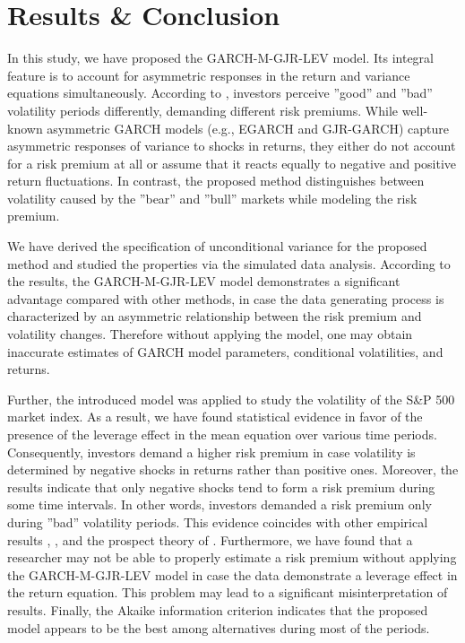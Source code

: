 \documentclass[authoryear, 1p]{elsarticle}
\numberwithin{equation}{section}
\begin{document}
\section{Results \& Conclusion}

In this study, we have proposed the GARCH-M-GJR-LEV model. Its integral feature is to account for asymmetric responses in the return and variance equations simultaneously. According to \citep{Bollerslev2022}, investors perceive ''good'' and ''bad'' volatility periods differently, demanding different risk premiums. While well-known asymmetric GARCH models (e.g., EGARCH and GJR-GARCH) capture asymmetric responses of variance to shocks in returns, they either do not account for a risk premium at all or assume that it reacts equally to negative and positive return fluctuations. In contrast, the proposed method distinguishes between volatility caused by the ''bear'' and ''bull'' markets while modeling the risk premium.

We have derived the specification of unconditional variance for the proposed method and studied the properties via the simulated data analysis. According to the results, the GARCH-M-GJR-LEV model demonstrates a significant advantage compared with other methods, in case the data generating process is characterized by an asymmetric relationship between the risk premium and volatility changes. Therefore without applying the model, one may obtain inaccurate estimates of GARCH model parameters, conditional volatilities, and returns.

Further, the introduced model was applied to study the volatility of the S\&P 500 market index. As a result, we have found statistical evidence in favor of the presence of the leverage effect in the mean equation over various time periods. Consequently, investors demand a higher risk premium in case volatility is determined by negative shocks in returns rather than positive ones. Moreover, the results indicate that only negative shocks tend to form a risk premium during some time intervals. In other words, investors demanded a risk premium only during ''bad'' volatility periods. This evidence coincides with other empirical results \citep{Bollerslev2006}, \citep{Rossi2015}, and the prospect theory of \citep{Kahneman1979}. Furthermore, we have found that a researcher may not be able to properly estimate a risk premium without applying the GARCH-M-GJR-LEV model in case the data demonstrate a leverage effect in the return equation. This problem may lead to a significant misinterpretation of results. Finally, the Akaike information criterion indicates that the proposed model appears to be the best among alternatives during most of the periods.
\end{document}
